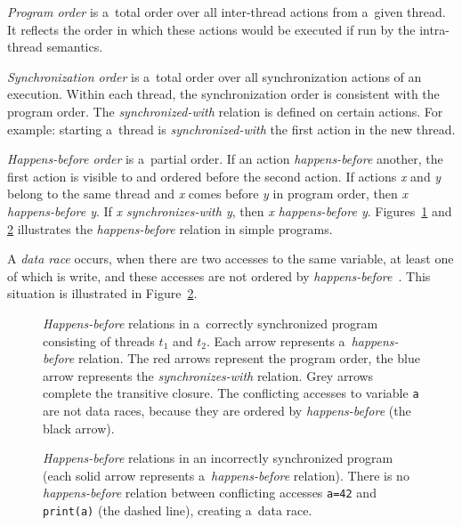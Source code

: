 \emph{Program order} is a~total order over all inter-thread actions from a~given
thread. It reflects the order in which these actions would be executed if
run by the intra-thread semantics.

\emph{Synchronization order} is a~total order over all synchronization actions
of an execution. Within each thread, the synchronization order is consistent
with the program order. The \emph{synchronized-with} relation is defined on
certain actions. For example: starting a~thread is \emph{synchronized-with}
the first action in the new thread.

\emph{Happens-before order} is a~partial order. If an action
\emph{happens-before} another, the first action is visible to and ordered before
the second action. If actions \emph{x} and \emph{y} belong to the same thread
and \emph{x} comes before \emph{y} in program order, then \emph{x happens-before
y}.  If \emph{x synchronizes-with y}, then \emph{x happens-before y}.
Figures~\ref{hb1} and \ref{hb2} illustrates the \emph{happens-before} relation
in simple programs.

A \emph{data race} occurs, when there are two accesses to the same variable, at
least one of which is write, and these accesses are not ordered by
\emph{happens-before}~\cite{jmmspec}. This situation is illustrated in
Figure~\ref{hb2}.

\begin{figure}[hbt]
    \label{hb1}
    
    \caption{\emph{Happens-before} relations in a~correctly synchronized program
    consisting of threads $t_1$ and $t_2$. Each arrow represents
    a~\emph{happens-before} relation. The red arrows represent the program
    order, the blue arrow represents the \emph{synchronizes-with} relation. Grey
    arrows complete the transitive closure. The conflicting accesses to variable
    \texttt{a} are not data races, because they are ordered by
    \emph{happens-before} (the black arrow).}
\end{figure}

\begin{figure}[hbt]
    \label{hb2}
    
    \caption{\emph{Happens-before} relations in an incorrectly synchronized
    program (each solid arrow represents a~\emph{happens-before} relation).
    There is no \emph{happens-before} relation between conflicting accesses
    \texttt{a=42} and \texttt{print(a)} (the dashed line), creating a~data
    race.}
\end{figure}


